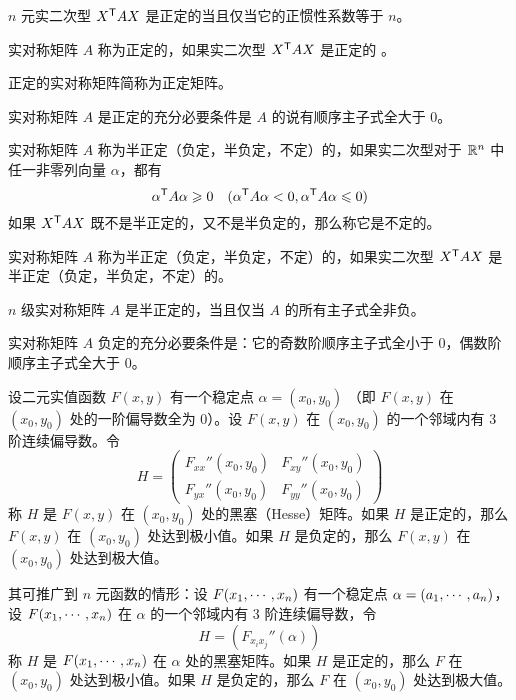 \begin{theorem}
    $n$ 元实二次型 ${X}^\mathsf{T}AX$ 是正定的当且仅当它的正惯性系数等于 $n$。
\end{theorem}

\begin{definition}
    实对称矩阵 $A$ 称为正定的，如果实二次型 ${X}^\mathsf{T}AX$ 是正定的 。
\end{definition}

正定的实对称矩阵简称为正定矩阵。

\begin{theorem}
    实对称矩阵 $A$ 是正定的充分必要条件是 $A$ 的说有顺序主子式全大于 $0$。
\end{theorem}

\begin{definition}
    实对称矩阵 $A$ 称为半正定（负定，半负定，不定）的，如果实二次型对于 $\mathbb{R}^n$ 中任一非零列向量 $\alpha$，都有
    \[{\alpha}^\mathsf{T}A\alpha \geqslant 0 \quad ({\alpha}^\mathsf{T}A\alpha<0,{\alpha}^\mathsf{T}A\alpha\leqslant 0)\]
    如果 ${X}^\mathsf{T}AX$ 既不是半正定的，又不是半负定的，那么称它是不定的。
\end{definition}

\begin{definition}
    实对称矩阵 $A$ 称为半正定（负定，半负定，不定）的，如果实二次型 ${X}^\mathsf{T}AX$ 是半正定（负定，半负定，不定）的。
\end{definition}

\begin{theorem}
    $n$ 级实对称矩阵 $A$ 是半正定的，当且仅当 $A$ 的所有主子式全非负。
\end{theorem}

\begin{theorem}
    实对称矩阵 $A$ 负定的充分必要条件是：它的奇数阶顺序主子式全小于 $0$，偶数阶顺序主子式全大于 $0$。
\end{theorem}

\begin{theorem}
    设二元实值函数 $F(x,y)$ 有一个稳定点 $\alpha=(x_0,y_0)$ （即 $F(x,y)$ 在 $(x_0,y_0)$ 处的一阶偏导数全为 $0$）。设 $F(x,y)$ 在 $(x_0,y_0)$ 的一个邻域内有 3 阶连续偏导数。令
    \[H = \left(\begin{matrix}
        F_{xx}''(x_0,y_0) & F_{xy}''(x_0,y_0)\\
        F_{yx}''(x_0,y_0) & F_{yy}''(x_0,y_0)
    \end{matrix}\right)\]
    称 $H$ 是 $F(x,y)$ 在 $(x_0,y_0)$ 处的黑塞（Hesse）矩阵。如果 $H$ 是正定的，那么 $F(x,y)$ 在 $(x_0,y_0)$ 处达到极小值。如果 $H$ 是负定的，那么 $F(x,y)$ 在 $(x_0,y_0)$ 处达到极大值。
\end{theorem}

其可推广到 $n$ 元函数的情形：设 $F(x_1,\cdots,x_n)$ 有一个稳定点 $\alpha = (a_1,\cdots,a_n)$，设 $F(x_1,\cdots,x_n)$ 在 $\alpha$ 的一个邻域内有 3 阶连续偏导数，令
\[H = (F_{x_ix_j}''(\alpha))\]
称 $H$ 是 $F(x_1,\cdots,x_n)$ 在 $\alpha$ 处的黑塞矩阵。如果 $H$ 是正定的，那么 $F$ 在 $(x_0,y_0)$ 处达到极小值。如果 $H$ 是负定的，那么 $F$ 在 $(x_0,y_0)$ 处达到极大值。
